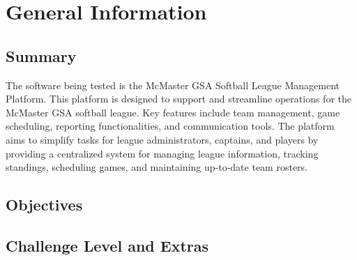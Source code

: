 \documentclass[12pt, titlepage]{article}
\begin{document}
\section{General Information}

\subsection{Summary}

The software being tested is the McMaster GSA Softball League Management Platform. This platform is designed to support and streamline operations for the McMaster GSA softball league. Key features include team management, game scheduling, reporting functionalities, and communication tools. The platform aims to simplify tasks for league administrators, captains, and players by providing a centralized system for managing league information, tracking standings, scheduling games, and maintaining up-to-date team rosters.

\subsection{Objectives}




\subsection{Challenge Level and Extras}
\end{document}
